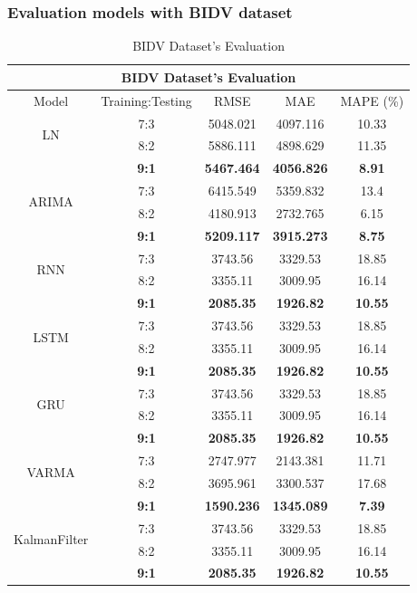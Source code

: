 \subsubsection{Evaluation models with BIDV dataset}
\begin{table}[H]
    \centering
    \caption{BIDV Dataset's Evaluation}
    \begin{tabular}{|c|c|c|c|c|}
         \hline
         \multicolumn{5}{|c|}{\textbf{BIDV Dataset's Evaluation}}\\
         \hline
         \centering Model & Training:Testing & RMSE & MAE & MAPE (\%)\\
         \hline
         \multirow{2}{*}{LN} & 7:3 & 5048.021&4097.116&10.33 \\ & 8:2 & 5886.111&4898.629&11.35 \\ & \textbf{9:1} & \textbf{5467.464} & \textbf{4056.826} & \textbf{8.91}\\
         \hline
         \multirow{2}{*}{ARIMA} & 7:3 & 6415.549&5359.832&13.4\\ & 8:2 & 4180.913&2732.765&6.15 \\ & \textbf{9:1} & \textbf{5209.117} & \textbf{3915.273} & \textbf{8.75}\\
         \hline
         \multirow{2}{*}{RNN} & 7:3 & 3743.56&3329.53&18.85\\ & 8:2 & 3355.11&3009.95&16.14 \\ & \textbf{9:1} & \textbf{2085.35} & \textbf{1926.82} & \textbf{10.55}\\
         \hline
         \multirow{2}{*}{LSTM} & 7:3 & 3743.56&3329.53&18.85\\ & 8:2 & 3355.11&3009.95&16.14 \\ & \textbf{9:1} & \textbf{2085.35} & \textbf{1926.82} & \textbf{10.55}\\
         \hline
         \multirow{2}{*}{GRU} & 7:3 & 3743.56&3329.53&18.85\\ & 8:2 & 3355.11&3009.95&16.14 \\ & \textbf{9:1} & \textbf{2085.35} & \textbf{1926.82} & \textbf{10.55}\\
         \hline
         \multirow{2}{*}{VARMA} & 7:3 & 2747.977&2143.381&11.71\\ & 8:2 & 3695.961&3300.537&17.68 \\ & \textbf{9:1} & \textbf{1590.236} & \textbf{1345.089} & \textbf{7.39}\\       
         \hline
         \multirow{2}{*}{KalmanFilter} & 7:3 & 3743.56&3329.53&18.85\\ & 8:2 & 3355.11&3009.95&16.14 \\ & \textbf{9:1} & \textbf{2085.35} & \textbf{1926.82} & \textbf{10.55}\\

\end{tabular}
\end{table}
